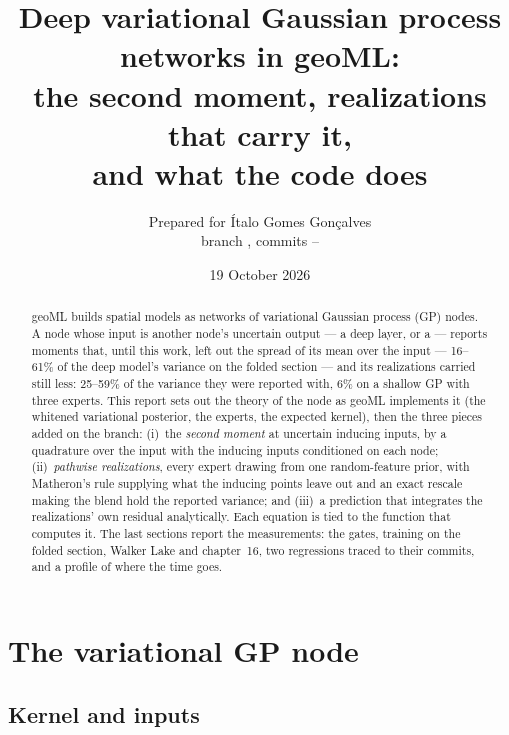 \documentclass[11pt,a4paper]{article}
\title{Deep variational Gaussian process networks in geoML:\\
the second moment, realizations that carry it,\\
and what the code does}
\author{Prepared for Ítalo Gomes Gonçalves \\ branch \code{deep-second-moment}, commits \code{c6d707c}--\code{1b84ed5}}
\date{19 October 2026}
\newcommand{\code}[1]{\texttt{\detokenize{#1}}}
\begin{document}
\sloppy
\maketitle

\begin{abstract}
geoML builds spatial models as networks of variational Gaussian process
(GP) nodes. A node whose input is another node's uncertain output --- a
deep layer, or a \code{GPWalk} --- reports moments that, until this work,
left out the spread of its mean over the input --- 16--61\% of the deep
model's variance on the folded section --- and its realizations carried
still less: 25--59\% of the variance they were reported with, 6\% on a
shallow GP with three experts. This
report sets out the theory of the node as geoML implements it (the
whitened variational posterior, the experts, the expected kernel), then
the three pieces added on the branch: (i)~the \emph{second moment} at
uncertain inducing inputs, by a quadrature over the input with the
inducing inputs conditioned on each node; (ii)~\emph{pathwise
realizations}, every expert drawing from one random-feature prior, with
Matheron's rule supplying what the inducing points leave out and an exact
rescale making the blend hold the reported variance; and (iii)~a
prediction that integrates the realizations' own residual analytically.
Each equation is tied to the function that computes it. The last sections
report the measurements: the gates, training on the folded section,
Walker Lake and chapter~16, two regressions traced to their commits, and
a profile of where the time goes.
\end{abstract}

\tableofcontents
\newpage

\section{The variational GP node}\label{sec:node}

\subsection{Kernel and inputs}
\end{document}
